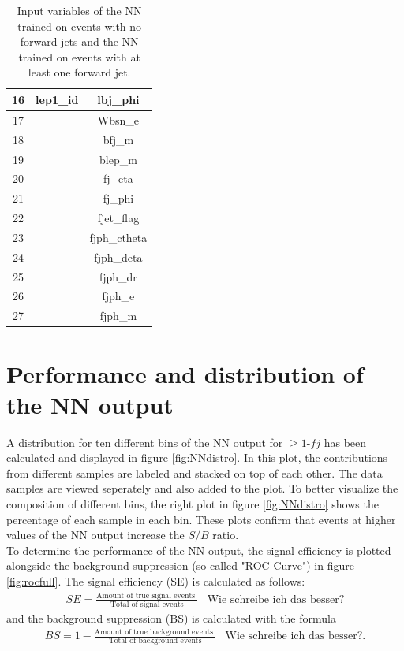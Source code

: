 \begin{table}
\begin{tabular}{c|c|c}
        16 &                           lep1\_id     & lbj\_phi\\ \hline
        17 &&                                           Wbsn\_e \\ \hline
        18 &&                                            bfj\_m \\ \hline
        19 &&                                           blep\_m \\ \hline
        20 &&                                           fj\_eta \\ \hline
        21 &&                                           fj\_phi \\ \hline
        22 &&                                        fjet\_flag \\ \hline
        23 &&                                      fjph\_ctheta \\ \hline
        24 &&                                        fjph\_deta \\ \hline
        25 &&                                          fjph\_dr \\ \hline
        26 &&                                           fjph\_e \\ \hline
        27 &&                                           fjph\_m \\ \hline
        \bottomrule 
    \end{tabular}
    \caption{Input variables of the NN trained on events with no forward jets and the NN trained on events with at least one forward jet.}
    \label{tab:features}
\end{table}


\section{Performance and distribution of the NN output}
A distribution for ten different bins of the NN output for $\geq 1\text{-}fj$ has been calculated and displayed in figure \ref{fig:NNdistro}. In this plot, the contributions from different samples are labeled and stacked on top of each other. The data samples are viewed seperately and also added to the plot.
To better visualize the composition of different bins, the right plot in figure \ref{fig:NNdistro} shows the percentage of each sample in each bin. These plots confirm that events at higher values of the NN output increase the $S/B$ ratio.  \\ 
To determine the performance of the NN output, the signal efficiency is plotted alongside the background suppression (so-called "ROC-Curve") in figure \ref{fig:rocfull}. 
The signal efficiency (SE) is calculated as follows: 
\begin{align*}
    SE = \frac{\text{Amount of true signal events }}{\text{Total of signal events}} & \text{Wie schreibe ich das besser?}
\end{align*}
and the background suppression (BS) is calculated with the formula
\begin{align*}
    BS = 1 - \frac{\text{Amount of true background events }}{\text{Total of background events}} & \text{Wie schreibe ich das besser?}.
\end{align*}





